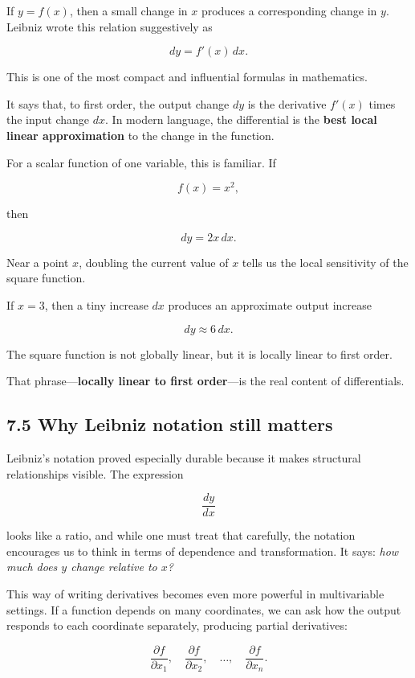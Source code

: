 If \(y=f(x)\), then a small change in \(x\) produces a corresponding
change in \(y\). Leibniz wrote this relation suggestively as

\[
dy = f'(x)\,dx.
\]

This is one of the most compact and influential formulas in mathematics.

It says that, to first order, the output change \(dy\) is the derivative
\(f'(x)\) times the input change \(dx\). In modern language, the
differential is the \textbf{best local linear approximation} to the
change in the function.

For a scalar function of one variable, this is familiar. If

\[
f(x)=x^2,
\]

then

\[
dy = 2x\,dx.
\]

Near a point \(x\), doubling the current value of \(x\) tells us the
local sensitivity of the square function.

If \(x=3\), then a tiny increase \(dx\) produces an approximate output
increase

\[
dy \approx 6\,dx.
\]

The square function is not globally linear, but it is locally linear to
first order.

That phrase---\textbf{locally linear to first order}---is the real
content of differentials.

\hypertarget{why-leibniz-notation-still-matters}{%
\subsection{7.5 Why Leibniz notation still
matters}\label{why-leibniz-notation-still-matters}}

Leibniz's notation proved especially durable because it makes structural
relationships visible. The expression

\[
\frac{dy}{dx}
\]

looks like a ratio, and while one must treat that carefully, the
notation encourages us to think in terms of dependence and
transformation. It says: \emph{how much does \(y\) change relative to
\(x\)?}

This way of writing derivatives becomes even more powerful in
multivariable settings. If a function depends on many coordinates, we
can ask how the output responds to each coordinate separately, producing
partial derivatives:

\[
\frac{\partial f}{\partial x_1},\quad \frac{\partial f}{\partial x_2},\quad \dots,\quad \frac{\partial f}{\partial x_n}.
\]

